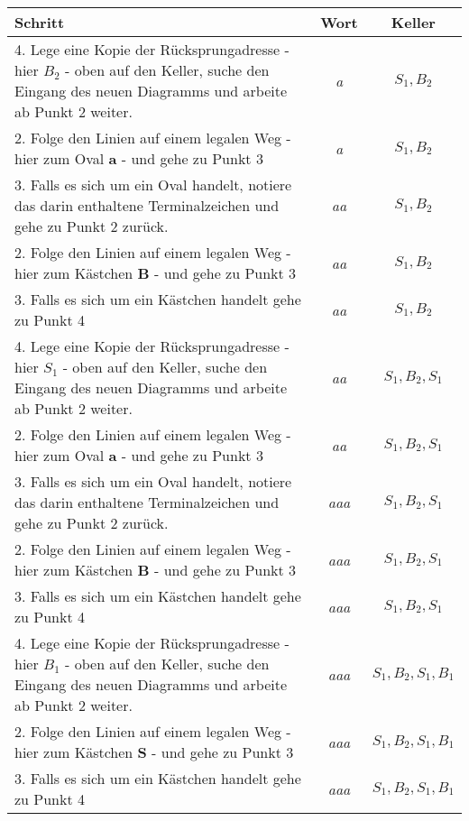 \documentclass{scrreprt}
\begin{document}
\begin{enumerate}[(a)]
  \begin{small}
  \begin{tabularx}{\linewidth}{X|c|c}
    \textbf{Schritt} & \textbf{Wort} & \textbf{Keller} \\
    \hline
    4. Lege eine Kopie der Rücksprungadresse - hier $B_2$ - oben auf den Keller,
    suche den Eingang des neuen Diagramms und arbeite ab Punkt 2 weiter. &
    \emph{a} & $S_1, B_2$ \\
    2. Folge den Linien auf einem legalen Weg - hier zum Oval \textbf{a} - und
    gehe zu Punkt 3 & \emph{a} & $S_1, B_2$ \\
    3. Falls es sich um ein Oval handelt, notiere das darin enthaltene
    Terminalzeichen und gehe zu Punkt 2 zurück. & \emph{aa} & $S_1, B_2$ \\
    2. Folge den Linien auf einem legalen Weg - hier zum Kästchen \textbf{B} -
    und gehe zu Punkt 3 & \emph{aa} & $S_1, B_2$ \\
    3. Falls es sich um ein Kästchen handelt gehe zu Punkt 4  & \emph{aa} &
    $S_1, B_2$ \\
    4. Lege eine Kopie der Rücksprungadresse - hier $S_1$ - oben auf den Keller,
    suche den Eingang des neuen Diagramms und arbeite ab Punkt 2 weiter. &
    \emph{aa} & $S_1, B_2, S_1$ \\
    2. Folge den Linien auf einem legalen Weg - hier zum Oval \textbf{a} - und
    gehe zu Punkt 3 & \emph{aa} & $S_1, B_2, S_1$ \\
    3. Falls es sich um ein Oval handelt, notiere das darin enthaltene
    Terminalzeichen und gehe zu Punkt 2 zurück.
    & \emph{aaa} & $S_1, B_2, S_1$ \\
    2. Folge den Linien auf einem legalen Weg - hier zum Kästchen \textbf{B} -
    und gehe zu Punkt 3 & \emph{aaa} & $S_1, B_2, S_1$ \\
    3. Falls es sich um ein Kästchen handelt gehe zu Punkt 4
    & \emph{aaa} & $S_1, B_2, S_1$ \\
    4. Lege eine Kopie der Rücksprungadresse - hier $B_1$ - oben auf den Keller,
    suche den Eingang des neuen Diagramms und arbeite ab Punkt 2 weiter.
    & \emph{aaa} & $S_1, B_2, S_1, B_1$ \\
    2. Folge den Linien auf einem legalen Weg - hier zum Kästchen \textbf{S} -
    und gehe zu Punkt 3 & \emph{aaa} & $S_1, B_2, S_1, B_1$ \\
    3. Falls es sich um ein Kästchen handelt gehe zu Punkt 4
    & \emph{aaa} & $S_1, B_2, S_1, B_1$ \\

\end{tabularx}
\end{small}
\end{enumerate}
\end{document}
